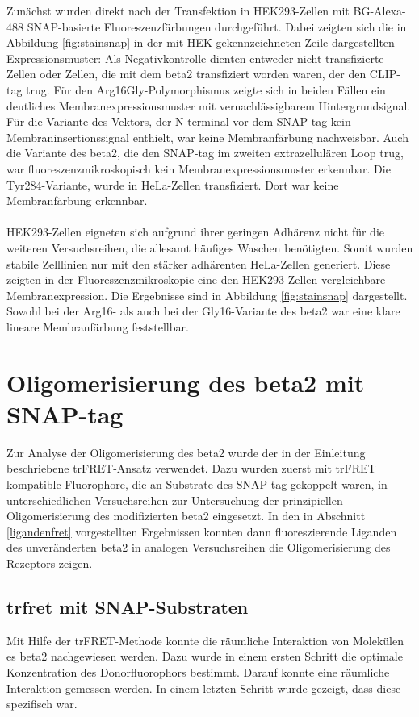 Zunächst wurden direkt nach der Transfektion in HEK293-Zellen mit BG-Alexa-488 SNAP-basierte Fluoreszenzfärbungen durchgeführt. Dabei zeigten sich die in Abbildung \ref{fig:stainsnap} in der mit HEK gekennzeichneten Zeile dargestellten Expressionsmuster: Als Negativkontrolle dienten entweder nicht transfizierte Zellen oder Zellen, die mit dem \gls{beta2} transfiziert worden waren, der den CLIP-tag trug. Für den Arg16Gly-Polymorphismus zeigte sich in beiden Fällen ein deutliches Membranexpressionsmuster mit vernachlässigbarem Hintergrundsignal. Für die Variante des Vektors, der N-terminal vor dem SNAP-tag kein Membraninsertionssignal enthielt, war keine Membranfärbung nachweisbar. Auch die Variante des \gls{beta2}, die den SNAP-tag im zweiten extrazellulären Loop trug, war fluoreszenzmikroskopisch kein Membranexpressionsmuster erkennbar. Die Tyr284-Variante, wurde in HeLa-Zellen transfiziert. Dort war keine Membranfärbung erkennbar.
\\ \\
HEK293-Zellen eigneten sich aufgrund ihrer geringen Adhärenz nicht für die weiteren Versuchsreihen, die allesamt häufiges Waschen benötigten. Somit wurden stabile Zelllinien nur mit den stärker adhärenten HeLa-Zellen generiert. Diese zeigten in der Fluoreszenzmikroskopie eine den HEK293-Zellen vergleichbare Membranexpression. Die Ergebnisse sind in Abbildung \ref{fig:stainsnap} dargestellt. Sowohl bei der Arg16- als auch bei der Gly16-Variante des \gls{beta2} war eine klare lineare Membranfärbung feststellbar.

\section{Oligomerisierung des \gls{beta2} mit SNAP-tag}
Zur Analyse der Oligomerisierung des \gls{beta2} wurde der in der Einleitung beschriebene trFRET-Ansatz verwendet. Dazu wurden zuerst mit trFRET kompatible Fluorophore, die an Substrate des SNAP-tag gekoppelt waren, in unterschiedlichen Versuchsreihen zur Untersuchung der prinzipiellen Oligomerisierung des modifizierten \gls{beta2} eingesetzt. In den in Abschnitt \ref{ligandenfret} vorgestellten Ergebnissen konnten dann fluoreszierende Liganden des unveränderten \gls{beta2} in analogen Versuchsreihen die Oligomerisierung des Rezeptors zeigen.

\subsection{\gls{trfret} mit SNAP-Substraten}
Mit Hilfe der trFRET-Methode konnte die räumliche Interaktion von Molekülen es \gls{beta2} nachgewiesen werden. Dazu wurde in einem ersten Schritt die optimale Konzentration des Donorfluorophors bestimmt. Darauf konnte eine räumliche Interaktion gemessen werden. In einem letzten Schritt wurde gezeigt, dass diese spezifisch war.


